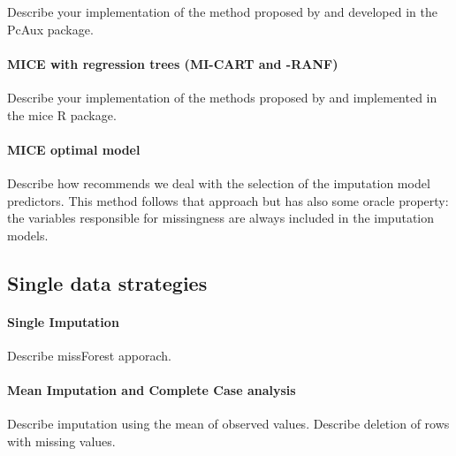 	Describe your implementation of the method proposed by \citet{howardEtAl:2015} and developed in the PcAux 
	package.
	
\paragraph{MICE with regression trees (MI-CART and -RANF)}
	Describe your implementation of the methods proposed by \citet{burgetteReiter:2010, shahEtAl:2014} and 
	implemented in the mice R package.

\paragraph{MICE optimal model}
	Describe how \citep[p. ??]{vanBuuren:2012} recommends we deal with the selection of the imputation model
	predictors. This method follows that approach but has also some oracle property: the variables responsible
	for missingness are always included in the imputation models.

\subsection{Single data strategies}

\paragraph{Single Imputation}
	Describe missForest apporach.

\paragraph{Mean Imputation and Complete Case analysis}
	Describe imputation using the mean of observed values.
	Describe deletion of rows with missing values.


